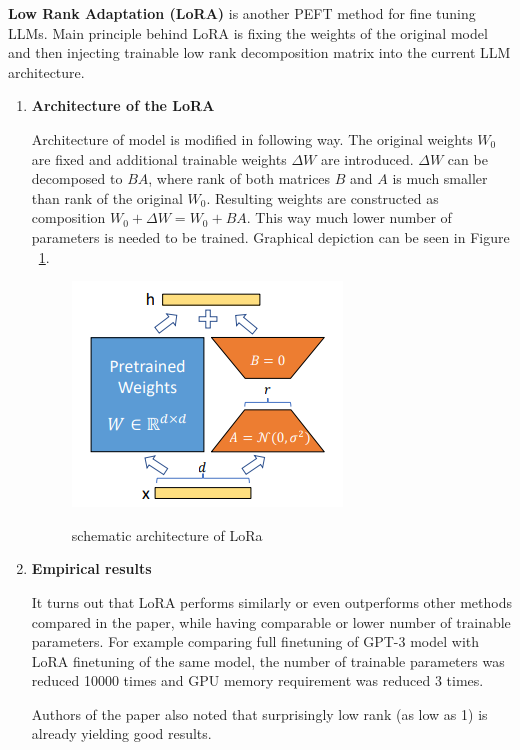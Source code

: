 
\textbf{Low Rank Adaptation (LoRA)} \cite{hu2021lora} is another PEFT method for fine tuning LLMs. Main principle behind LoRA is fixing the weights of the original model and then injecting trainable low rank decomposition matrix into the current LLM architecture. 

\begin{enumerate}
    \item \textbf{Architecture of the LoRA}

    Architecture of model is modified in following way. The original weights $W_{0}$ are fixed and additional trainable weights $\Delta W$ are introduced. $\Delta W$ can be decomposed to $BA$, where rank of both matrices $B$ and $A$ is much smaller than rank of the original $W_{0}$. Resulting weights are constructed as composition $W_{0} + \Delta W = W_{0} + BA$. This way much lower number of parameters is needed to be trained. Graphical depiction can be seen in Figure ~\ref{fig:LoRA}.

    \begin{figure}[h!]
        \centering
        {\includegraphics[scale=0.9]{imgs/LoRA.png}}
        \caption{schematic architecture of LoRa \cite{hu2021lora}}
        \label{fig:LoRA}
    \end{figure}
    
    \item \textbf{Empirical results}
    
    It turns out that LoRA performs similarly or even outperforms other methods compared in the paper, while having comparable or lower number of trainable parameters.
    For example comparing full finetuning of GPT-3 model with LoRA finetuning of the same model, the number of trainable parameters was reduced 10000 times and GPU memory requirement was reduced 3 times.
    
    Authors of the paper also noted that surprisingly low rank (as low as 1) is already yielding good results.
    

\end{enumerate}
